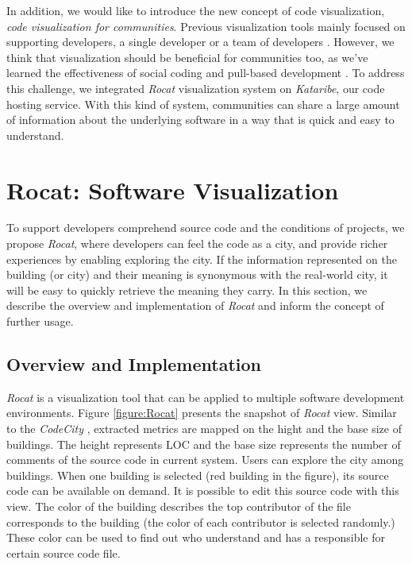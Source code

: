 \documentclass[conference]{IEEEtran}
\newcommand{\figref}[1]{Figure \ref{#1}}
\begin{document}
In addition, we would like to introduce the new concept of code visualization, \textit{code visualization for communities}.
Previous visualization tools mainly focused on supporting developers, a single developer \cite{Wettel:2011:SSC:1985793.1985868} or a team of developers \cite{6648194}.
However, we think that visualization should be beneficial for communities too, as we've learned the effectiveness of social coding \cite{Dabbish:2012:SCG:2145204.2145396} and pull-based development \cite{Gousios:2014:ESP:2568225.2568260}.
To address this challenge, we integrated \textit{Rocat} visualization system on \textit{Kataribe},  our code hosting service.
With this kind of system, communities can share a large amount of information about the underlying software in a way that is quick and easy to understand.

\section{Rocat: Software Visualization}
To support developers comprehend source code and the conditions of projects, we propose \textit{Rocat}, where developers can feel the code as a city, and provide richer experiences by enabling exploring the city.
If the information represented on the building (or city) and their meaning is synonymous with the real-world city, it will be easy to quickly retrieve the meaning they carry.
In this section, we describe the overview and implementation of \textit{Rocat} and inform the concept of further usage.

\subsection{Overview and Implementation}
\textit{Rocat} is a visualization tool that can be applied to multiple software development environments.
\figref{figure:Rocat} presents the snapshot of \textit{Rocat} view.
Similar to the \textit{CodeCity} \cite{Wettel:2011:SSC:1985793.1985868}, extracted metrics are mapped on the hight and the base size of buildings.
The height represents LOC and the base size represents the number of comments of the source code in current system.
Users can explore the city among buildings.
When one building is selected (red building in the figure), its source code can be available on demand.
It is possible to edit this source code with this view.
The color of the building describes the top contributor of the file corresponds to the building (the color of each contributor is selected randomly.)
These color can be used to find out who understand and has a responsible for certain source code file.
\end{document}
